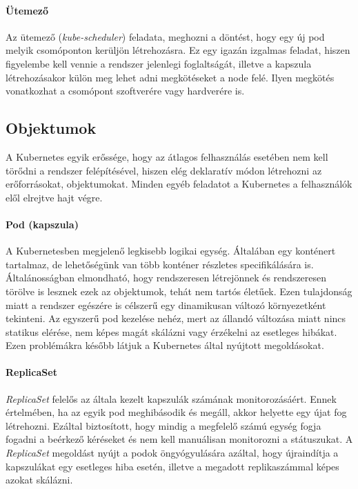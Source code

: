 \paragraph{Ütemező} Az ütemező (\textit{kube-scheduler}) feladata, meghozni a döntést, hogy egy új pod melyik csomóponton kerüljön létrehozásra.
Ez egy igazán izgalmas feladat, hiszen figyelembe kell vennie a rendszer jelenlegi foglaltságát, illetve a kapszula létrehozásakor külön meg lehet adni megkötéseket a node felé. 
Ilyen megkötés vonatkozhat a csomópont szoftverére vagy hardverére is.  

\subsection{Objektumok}
A Kubernetes egyik erőssége, hogy az átlagos felhasználás esetében nem kell törődni a rendszer felépítésével, hiszen elég deklaratív módon létrehozni az erőforrásokat, objektumokat.
Minden egyéb feladatot a Kubernetes a felhasználók elől elrejtve hajt végre.

\paragraph{Pod (kapszula)}
A Kubernetesben megjelenő legkisebb logikai egység.
Általában egy konténert tartalmaz, de lehetőségünk van több konténer részletes specifikálására is.
Általánosságban elmondható, hogy rendszeresen létrejönnek és rendszeresen törölve is lesznek ezek az objektumok, tehát nem tartós életűek.
Ezen tulajdonság miatt a rendszer egészére is célszerű egy dinamikusan változó környezetként tekinteni.
Az egyszerű pod kezelése nehéz, mert az állandó változása miatt nincs statikus elérése, nem képes magát skálázni vagy érzékelni az esetleges hibákat. 
Ezen problémákra később látjuk a Kubernetes által nyújtott megoldásokat.

\paragraph{ReplicaSet} 
\textit{ReplicaSet} felelős az általa kezelt kapszulák számának monitorozásáért.
Ennek értelmében, ha az egyik pod meghibásodik és megáll, akkor helyette egy újat fog létrehozni.
Ezáltal biztosított, hogy mindig a megfelelő számú egység fogja fogadni a beérkező kéréseket és nem kell manuálisan monitorozni a státuszukat.
A \textit{ReplicaSet} megoldást nyújt a podok öngyógyulására azáltal, hogy újraindítja a kapszulákat egy esetleges hiba esetén, illetve a megadott replikaszámmal képes azokat skálázni.

